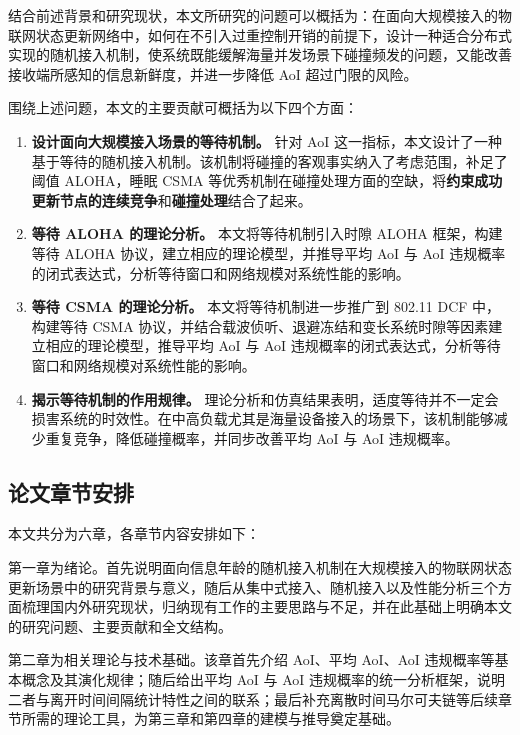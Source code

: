 结合前述背景和研究现状，本文所研究的问题可以概括为：在面向大规模接入的物联网状态更新网络中，如何在不引入过重控制开销的前提下，设计一种适合分布式实现的随机接入机制，使系统既能缓解海量并发场景下碰撞频发的问题，又能改善接收端所感知的信息新鲜度，并进一步降低 AoI 超过门限的风险。

围绕上述问题，本文的主要贡献可概括为以下四个方面：
\begin{enumerate}[wide]
    \item \textbf{设计面向大规模接入场景的等待机制。} 针对 AoI 这一指标，本文设计了一种基于等待的随机接入机制。该机制将碰撞的客观事实纳入了考虑范围，补足了阈值 ALOHA，睡眠 CSMA 等优秀机制在碰撞处理方面的空缺，将\textbf{约束成功更新节点的连续竞争}和\textbf{碰撞处理}结合了起来。

    \item \textbf{等待 ALOHA 的理论分析。} 本文将等待机制引入时隙 ALOHA 框架，构建等待 ALOHA 协议，建立相应的理论模型，并推导平均 AoI 与 AoI 违规概率的闭式表达式，分析等待窗口和网络规模对系统性能的影响。

    \item \textbf{等待 CSMA 的理论分析。} 本文将等待机制进一步推广到 802.11 DCF 中，构建等待 CSMA 协议，并结合载波侦听、退避冻结和变长系统时隙等因素建立相应的理论模型，推导平均 AoI 与 AoI 违规概率的闭式表达式，分析等待窗口和网络规模对系统性能的影响。

    \item \textbf{揭示等待机制的作用规律。} 理论分析和仿真结果表明，适度等待并不一定会损害系统的时效性。在中高负载尤其是海量设备接入的场景下，该机制能够减少重复竞争，降低碰撞概率，并同步改善平均 AoI 与 AoI 违规概率。
\end{enumerate}

\subsection{论文章节安排}

本文共分为六章，各章节内容安排如下：

第一章为绪论。首先说明面向信息年龄的随机接入机制在大规模接入的物联网状态更新场景中的研究背景与意义，随后从集中式接入、随机接入以及性能分析三个方面梳理国内外研究现状，归纳现有工作的主要思路与不足，并在此基础上明确本文的研究问题、主要贡献和全文结构。

第二章为相关理论与技术基础。该章首先介绍 AoI、平均 AoI、AoI 违规概率等基本概念及其演化规律；随后给出平均 AoI 与 AoI 违规概率的统一分析框架，说明二者与离开时间间隔统计特性之间的联系；最后补充离散时间马尔可夫链等后续章节所需的理论工具，为第三章和第四章的建模与推导奠定基础。

